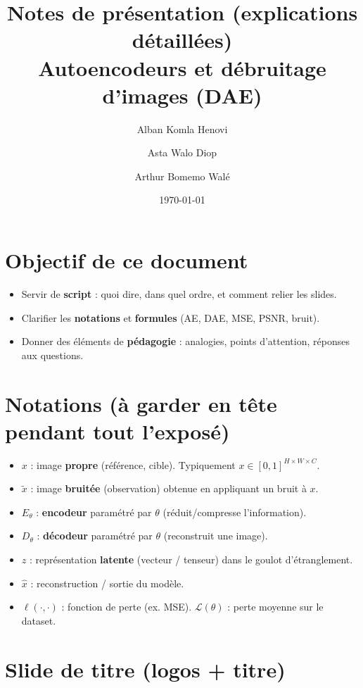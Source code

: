 \documentclass[11pt,a4paper]{article}
\title{Notes de présentation (explications détaillées)\\Autoencodeurs et débruitage d'images (DAE)}
\author{Alban Komla Henovi \and Asta Walo Diop \and Arthur Bomemo Walé}
\date{\today}
\begin{document}
\maketitle

\section*{Objectif de ce document}
\begin{itemize}
  \item Servir de \textbf{script} : quoi dire, dans quel ordre, et comment relier les slides.
  \item Clarifier les \textbf{notations} et \textbf{formules} (AE, DAE, MSE, PSNR, bruit).
  \item Donner des éléments de \textbf{pédagogie} : analogies, points d'attention, réponses aux questions.
\end{itemize}

\section*{Notations (à garder en tête pendant tout l'exposé)}
\begin{itemize}
  \item $x$ : image \textbf{propre} (référence, cible). Typiquement $x\in[0,1]^{H\times W\times C}$.
  \item $\tilde{x}$ : image \textbf{bruitée} (observation) obtenue en appliquant un bruit à $x$.
  \item $E_\theta$ : \textbf{encodeur} paramétré par $\theta$ (réduit/compresse l'information).
  \item $D_\theta$ : \textbf{décodeur} paramétré par $\theta$ (reconstruit une image).
  \item $z$ : représentation \textbf{latente} (vecteur / tenseur) dans le goulot d'étranglement.
  \item $\hat{x}$ : reconstruction / sortie du modèle.
  \item $\ell(\cdot,\cdot)$ : fonction de perte (ex. MSE). $\mathcal{L}(\theta)$ : perte moyenne sur le dataset.
\end{itemize}

\newpage
\tableofcontents
\newpage

\section{Slide de titre (logos + titre)}
\end{document}
